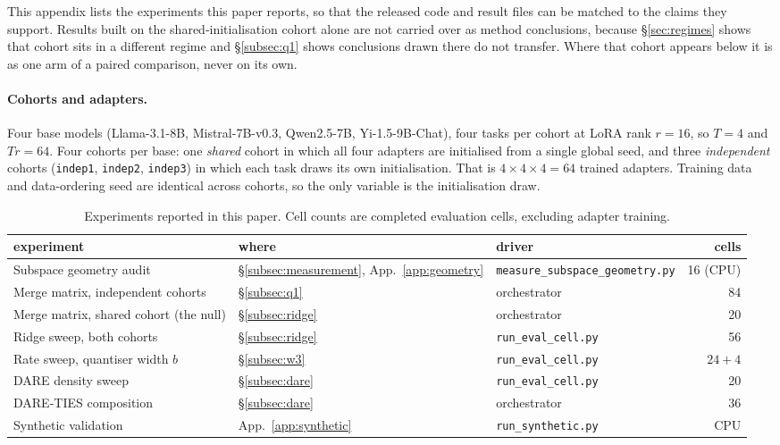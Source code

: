 This appendix lists the experiments this paper reports, so that the
released code and result files can be matched to the claims they support.
Results built on the shared-initialisation cohort alone are not
carried over as method conclusions, because \S\ref{sec:regimes} shows that
cohort sits in a different regime and \S\ref{subsec:q1} shows conclusions
drawn there do not transfer. Where that cohort appears below it is as one arm
of a paired comparison, never on its own.

\paragraph{Cohorts and adapters.} Four base models (Llama-3.1-8B,
Mistral-7B-v0.3, Qwen2.5-7B, Yi-1.5-9B-Chat), four tasks per cohort at
LoRA rank $r=16$, so $T=4$ and $Tr=64$. Four cohorts per base: one
\emph{shared} cohort in which all four adapters are initialised from a
single global seed, and three \emph{independent} cohorts
(\texttt{indep1}, \texttt{indep2}, \texttt{indep3}) in which each task
draws its own initialisation. That is $4 \times 4 \times 4 = 64$ trained
adapters. Training data and data-ordering seed are identical across
cohorts, so the only variable is the initialisation draw.

\begin{table}[h]
\centering
\small
\caption{Experiments reported in this paper. Cell counts are completed
evaluation cells, excluding adapter training.}
\label{tab:manifest}
\begin{tabular}{lllr}
\toprule
experiment & where & driver & cells \\
\midrule
Subspace geometry audit & \S\ref{subsec:measurement}, App.~\ref{app:geometry}
  & \texttt{measure\_subspace\_geometry.py} & 16 (CPU) \\
Merge matrix, independent cohorts & \S\ref{subsec:q1}
  & orchestrator & 84 \\
Merge matrix, shared cohort (the null) & \S\ref{subsec:ridge}
  & orchestrator & 20 \\
Ridge sweep, both cohorts & \S\ref{subsec:ridge}
  & \texttt{run\_eval\_cell.py} & 56 \\
Rate sweep, quantiser width $b$ & \S\ref{subsec:w3}
  & \texttt{run\_eval\_cell.py} & $24 + 4$ \\
DARE density sweep & \S\ref{subsec:dare}
  & \texttt{run\_eval\_cell.py} & 20 \\
DARE-TIES composition & \S\ref{subsec:dare}
  & orchestrator & 36 \\
Synthetic validation & App.~\ref{app:synthetic}
  & \texttt{run\_synthetic.py} & CPU \\
\bottomrule
\end{tabular}
\end{table}

